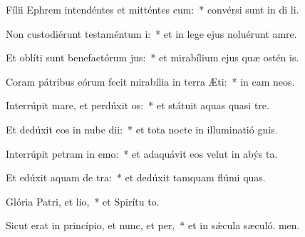 \item Fílii Ephrem intendéntes et mitténtes cum:~* convérsi sunt in di li.
\item Non custodiérunt testaméntum i:~* et in lege ejus noluérunt amre.
\item Et oblíti sunt benefactórum jus:~* et mirabílium ejus quæ ostén is.
\item Coram pátribus eórum fecit mirabília in terra Æti:~* in cam neos.
\item Interrúpit mare, et perdúxit os:~* et státuit aquas quasi  tre.
\item Et dedúxit eos in nube dii:~* et tota nocte in illuminatió gnis.
\item Interrúpit petram in emo:~* et adaquávit eos velut in abýs ta.
\item Et edúxit aquam de tra:~* et dedúxit tamquam flúmi quas.
\item Glória Patri, et lio,~* et Spirítu to.
\item Sicut erat in princípio, et nunc, et per,~* et in sǽcula sæculó. men.
